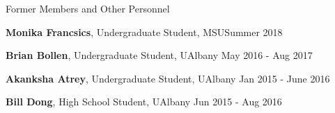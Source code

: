 \documentclass{resume} %
\begin{document}
\begin{rSection}{Former Members and Other Personnel}
\begin{list}{}{\leftmargin=1em}
   \item \textbf{Monika Francsics}, Undergraduate Student, MSU\hfill Summer 2018

   \item \textbf{Brian Bollen}, Undergraduate Student, UAlbany \hfill May 2016 - Aug 2017

   \item \textbf{Akanksha Atrey}, Undergraduate Student, UAlbany \hfill Jan 2015 - June 2016

   \item \textbf{Bill Dong}, High School Student, UAlbany \hfill Jun 2015 - Aug 2016
\end{list}

\end{rSection}
\end{document}
